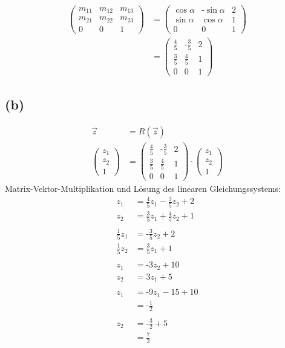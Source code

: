 \documentclass[a4paper]{scrartcl}
\begin{document}
\begin{align*}
\left(\begin{matrix} m_11 & m_12 & m_13 \\ m_21 & m_22 & m_23 \\ 0 & 0 & 1 \end{matrix}\right) &
= \left(\begin{matrix} \cos\alpha & \text{-}\sin\alpha & 2 \\ \sin\alpha & \cos\alpha & 1 \\ 0 & 0 & 1 \end{matrix}\right) \\
& = \left(\begin{matrix} \frac{4}{5} & \text{-}\frac{3}{5} & 2 \\ \frac{3}{5} & \frac{4}{5} & 1 \\ 0 & 0 & 1 \end{matrix}\right)
\end{align*}

\subsection*{(b)}
\begin{align*}
\vec{z} & = R\left(\vec{z}\right) \\
\left(\begin{matrix} z_1 \\ z_2 \\ 1 \end{matrix}\right) & = 
\left(\begin{matrix} \frac{4}{5} & \text{-}\frac{3}{5} & 2 \\ \frac{3}{5} & \frac{4}{5} & 1 \\ 0 & 0 & 1 \end{matrix}\right)
\cdot
\left(\begin{matrix} z_1 \\ z_2 \\ 1 \end{matrix}\right)
\end{align*}
Matrix-Vektor-Multiplikation und Lösung des linearen Gleichungssystems:
\begin{align*}
z_1 & = \frac{4}{5} z_1 - \frac{3}{5} z_2 + 2 \\
z_2 & = \frac{3}{5} z_1 + \frac{4}{5} z_2 + 1 \\
\\
\frac{1}{5} z_1 & =  \text{-}\frac{3}{5} z_2 + 2 \\
\frac{1}{5} z_2 & = \frac{3}{5} z_1 + 1 \\
\\
z_1 & =  \text{-} 3 z_2 + 10 \\
z_2 & = 3 z_1 + 5 \\
\\
z_1 & = \text{-}9 z_1 - 15 + 10 \\
    & = \text{-}\frac{1}{2} \\
\\
z_2 & = \text{-}\frac{3}{2} + 5 \\
    & = \frac{7}{2}
\end{align*}
\end{document}
